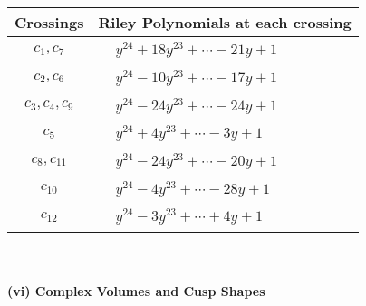 \documentclass[1p]{elsarticle_modified}
\theoremstyle{definition}
\begin{document}
\begin{tabular}{m{50pt}|m{274pt}}
Crossings & \hspace{64pt}Riley Polynomials at each crossing \\
\hline $$\begin{aligned}c_{1},c_{7}\end{aligned}$$&$\begin{aligned}
&y^{24}+18 y^{23}+\cdots-21 y+1
\end{aligned}$\\
\hline $$\begin{aligned}c_{2},c_{6}\end{aligned}$$&$\begin{aligned}
&y^{24}-10 y^{23}+\cdots-17 y+1
\end{aligned}$\\
\hline $$\begin{aligned}c_{3},c_{4},c_{9}\end{aligned}$$&$\begin{aligned}
&y^{24}-24 y^{23}+\cdots-24 y+1
\end{aligned}$\\
\hline $$\begin{aligned}c_{5}\end{aligned}$$&$\begin{aligned}
&y^{24}+4 y^{23}+\cdots-3 y+1
\end{aligned}$\\
\hline $$\begin{aligned}c_{8},c_{11}\end{aligned}$$&$\begin{aligned}
&y^{24}-24 y^{23}+\cdots-20 y+1
\end{aligned}$\\
\hline $$\begin{aligned}c_{10}\end{aligned}$$&$\begin{aligned}
&y^{24}-4 y^{23}+\cdots-28 y+1
\end{aligned}$\\
\hline $$\begin{aligned}c_{12}\end{aligned}$$&$\begin{aligned}
&y^{24}-3 y^{23}+\cdots+4 y+1
\end{aligned}$\\
\hline
\end{tabular}\\~\\
\newpage\flushleft \textbf{(vi) Complex Volumes and Cusp Shapes}
\end{document}

